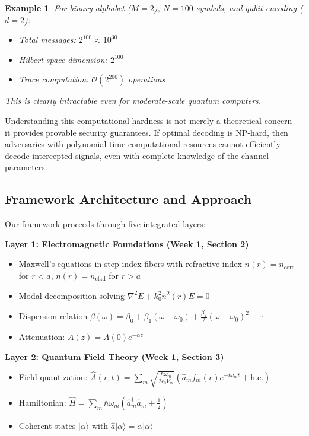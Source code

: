 \documentclass[12pt,a4paper]{article}
\newtheorem{example}[theorem]{Example}
\begin{document}
\begin{example}
For binary alphabet ($M=2$), $N=100$ symbols, and qubit encoding ($d=2$):
\begin{itemize}
\item Total messages: $2^{100} \approx 10^{30}$
\item Hilbert space dimension: $2^{100}$
\item Trace computation: $\mathcal{O}(2^{200})$ operations
\end{itemize}
This is clearly intractable even for moderate-scale quantum computers.
\end{example}

Understanding this computational hardness is not merely a theoretical concern—it provides provable security guarantees. If optimal decoding is NP-hard, then adversaries with polynomial-time computational resources cannot efficiently decode intercepted signals, even with complete knowledge of the channel parameters.

\subsection{Framework Architecture and Approach}

Our framework proceeds through five integrated layers:

\textbf{Layer 1: Electromagnetic Foundations (Week 1, Section 2)}
\begin{itemize}
\item Maxwell's equations in step-index fibers with refractive index $n(r) = n_{\text{core}}$ for $r < a$, $n(r) = n_{\text{clad}}$ for $r > a$
\item Modal decomposition solving $\nabla^2 E + k_0^2 n^2(r) E = 0$
\item Dispersion relation $\beta(\omega) = \beta_0 + \beta_1(\omega - \omega_0) + \frac{\beta_2}{2}(\omega - \omega_0)^2 + \cdots$
\item Attenuation: $A(z) = A(0)e^{-\alpha z}$
\end{itemize}

\textbf{Layer 2: Quantum Field Theory (Week 1, Section 3)}
\begin{itemize}
\item Field quantization: $\hat{A}(r,t) = \sum_m \sqrt{\frac{\hbar\omega_m}{2\epsilon_0 V_m}}(\hat{a}_m f_m(r) e^{-i\omega_m t} + \text{h.c.})$
\item Hamiltonian: $\hat{H} = \sum_m \hbar\omega_m(\hat{a}_m^\dagger \hat{a}_m + \frac{1}{2})$
\item Coherent states $|\alpha\rangle$ with $\hat{a}|\alpha\rangle = \alpha|\alpha\rangle$
\end{itemize}
\end{document}
